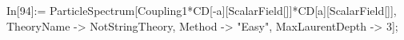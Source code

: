 In[94]:= ParticleSpectrum[Coupling1*CD[-a][ScalarField[]]*CD[a][ScalarField[]], TheoryName -> NotStringTheory, Method -> "Easy", MaxLaurentDepth -> 3]; 